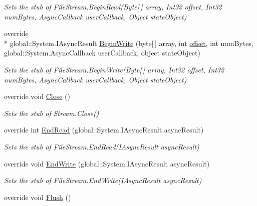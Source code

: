 \begin{DoxyCompactItemize}
\begin{DoxyCompactList}\small\item\em Sets the stub of File\-Stream.\-Begin\-Read(\-Byte\mbox{[}$\,$\mbox{]} array, Int32 offset, Int32 num\-Bytes, Async\-Callback user\-Callback, Object state\-Object)\end{DoxyCompactList}\item 
override \\*
global\-::\-System.\-I\-Async\-Result \hyperlink{class_system_1_1_i_o_1_1_fakes_1_1_stub_file_stream_a3ebf8289489987c121f6cf0e3b81bd02}{Begin\-Write} (byte\mbox{[}$\,$\mbox{]} array, int \hyperlink{jquery-1_810_82_8js_a4a9f594d20d927164551fc7fa4751a2f}{offset}, int num\-Bytes, global\-::\-System.\-Async\-Callback user\-Callback, object state\-Object)
\begin{DoxyCompactList}\small\item\em Sets the stub of File\-Stream.\-Begin\-Write(\-Byte\mbox{[}$\,$\mbox{]} array, Int32 offset, Int32 num\-Bytes, Async\-Callback user\-Callback, Object state\-Object)\end{DoxyCompactList}\item 
override void \hyperlink{class_system_1_1_i_o_1_1_fakes_1_1_stub_file_stream_af2496e85fa21c3b0d069bd4a5c97d2db}{Close} ()
\begin{DoxyCompactList}\small\item\em Sets the stub of Stream.\-Close()\end{DoxyCompactList}\item 
override int \hyperlink{class_system_1_1_i_o_1_1_fakes_1_1_stub_file_stream_a70949c3c66780b81c98f91204ff6eac0}{End\-Read} (global\-::\-System.\-I\-Async\-Result async\-Result)
\begin{DoxyCompactList}\small\item\em Sets the stub of File\-Stream.\-End\-Read(\-I\-Async\-Result async\-Result)\end{DoxyCompactList}\item 
override void \hyperlink{class_system_1_1_i_o_1_1_fakes_1_1_stub_file_stream_a8ebc4dba04faf61407415d3b82a4e28e}{End\-Write} (global\-::\-System.\-I\-Async\-Result async\-Result)
\begin{DoxyCompactList}\small\item\em Sets the stub of File\-Stream.\-End\-Write(\-I\-Async\-Result async\-Result)\end{DoxyCompactList}\item 
override void \hyperlink{class_system_1_1_i_o_1_1_fakes_1_1_stub_file_stream_a1c4777bb1fabe10881ddac0725c7814e}{Flush} ()

\end{DoxyCompactItemize}
